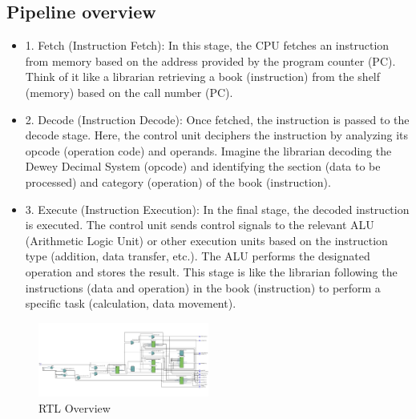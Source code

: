\documentclass[9pt,a4paper,twoside]{tau}
\begin{document}
\subsection{Pipeline overview}
    \begin{itemize}
        \item 1. Fetch (Instruction Fetch):
        In this stage, the CPU fetches an instruction from memory based on the address provided by the program counter (PC). Think of it like a librarian retrieving a book (instruction) from the shelf (memory) based on the call number (PC).
        \item 2. Decode (Instruction Decode): Once fetched, the instruction is passed to the decode stage. Here, the control unit deciphers the instruction by analyzing its opcode (operation code) and operands.
        Imagine the librarian decoding the Dewey Decimal System (opcode) and identifying the section (data to be processed) and category (operation) of the book (instruction).
        \item 3. Execute (Instruction Execution): In the final stage, the decoded instruction is executed. The control unit sends control signals to the relevant ALU (Arithmetic Logic Unit) or other execution units based on the instruction type (addition, data transfer, etc.). The ALU performs the designated operation and stores the result. This stage is like the librarian following the instructions (data and operation) in the book (instruction) to perform a specific task (calculation, data movement).
    
    \end{itemize}
    

\begin{figure}[h]  %
    \centering  %
    \includegraphics[width=0.5\textwidth]{images/RTLImg.png}
    \caption{RTL Overview}
    \label{fig:RTL Overview}
\end{figure}

\end{document}
